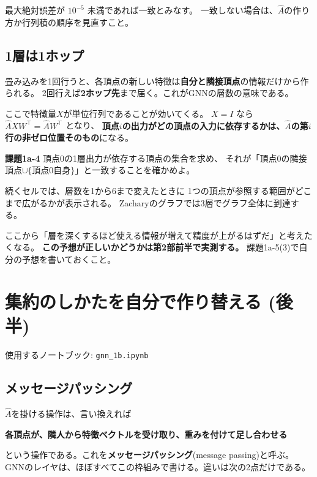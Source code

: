 \documentclass[11pt,a4paper]{jsarticle}
\begin{document}
\noindent
最大絶対誤差が $10^{-5}$ 未満であれば一致とみなす。
一致しない場合は、$\hat{A}$の作り方か行列積の順序を見直すこと。

\subsection{1層は1ホップ}\label{sec:onehop}

畳み込みを1回行うと、各頂点の新しい特徴は\textbf{自分と隣接頂点}の情報だけから作られる。
2回行えば\textbf{2ホップ先}まで届く。これがGNNの層数の意味である。

ここで特徴量$X$が単位行列であることが効いてくる。
$X=I$ なら $\hat{A}XW^{\top}=\hat{A}W^{\top}$ となり、
\textbf{頂点$i$の出力がどの頂点の入力に依存するかは、$\hat{A}$の第$i$行の非ゼロ位置そのもの}になる。

\begin{screen}
\textbf{課題1a-4} \quad 頂点0の1層出力が依存する頂点の集合を求め、
それが「頂点0の隣接頂点$\cup\{$頂点0自身$\}$」と一致することを確かめよ。
\end{screen}

\noindent
続くセルでは、層数を1から6まで変えたときに
1つの頂点が参照する範囲がどこまで広がるかが表示される。
Zacharyのグラフでは3層でグラフ全体に到達する。

ここから「層を深くするほど使える情報が増えて精度が上がるはずだ」と考えたくなる。
\textbf{この予想が正しいかどうかは第2部前半で実測する。}
課題1a-5(3)で自分の予想を書いておくこと。

\section{集約のしかたを自分で作り替える (後半)}

使用するノートブック: \verb|gnn_1b.ipynb|

\subsection{メッセージパッシング}

$\hat{A}$を掛ける操作は、言い換えれば

\begin{center}
\textbf{各頂点が、隣人から特徴ベクトルを受け取り、重みを付けて足し合わせる}
\end{center}

\noindent
という操作である。これを\textbf{メッセージパッシング}(message passing)と呼ぶ。
GNNのレイヤは、ほぼすべてこの枠組みで書ける。違いは次の2点だけである。
\end{document}

